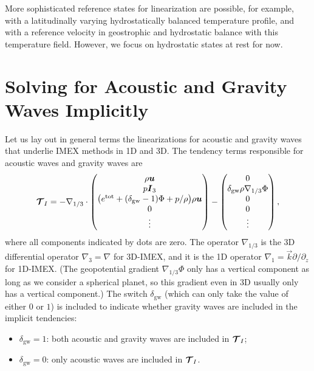 \documentclass{report}
\begin{document}
More sophisticated reference states for linearization are possible, for example, with a latitudinally varying hydrostatically balanced temperature profile, and with a reference velocity in geostrophic and hydrostatic balance with this temperature field. However, we focus on hydrostatic states at rest for now. 
 
 \section{Solving for Acoustic and Gravity Waves Implicitly}
 \label{s:IMEX_general}

Let us lay out in general terms the linearizations for acoustic and gravity waves that underlie IMEX methods in 1D and 3D. The tendency terms responsible for acoustic waves and gravity waves are
 \begin{equation}
 \boldsymbol{{\mathcal{T}}}_{I}= -\nabla_{1/3} \cdot
 \begin{pmatrix}
 \rho \boldsymbol{{u}} \\
 p \boldsymbol{{I}}_3 \\
 \bigl(e^{\mathrm{tot}} + (\delta_{\mathrm{gw}}-1) \Phi + p/\rho \bigr) \rho \boldsymbol{{u}} \\
 0\\
 \vdots
 \end{pmatrix}
 - \begin{pmatrix}
 0 \\
 \delta_{\mathrm{gw}} \rho \nabla_{1/3} \Phi \\
 0\\
 0\\
 \vdots
 \end{pmatrix},
 \label{e:3D-imex/tendencies}
 \end{equation}
where all components indicated by dots are zero. The operator $\nabla_{1/3}$ is the 3D differential operator $\nabla_3 = \nabla$ for 3D-IMEX, and it is the 1D operator $\nabla_1 = \vec{k} \partial/\partial_z$ for 1D-IMEX. (The geopotential gradient $\nabla_{1/3} \Phi$ only has a vertical component as long as we consider a spherical planet, so this gradient even in 3D usually only has a vertical component.) The switch $\delta_{\mathrm{gw}}$ (which can only take the value of either $0$ or $1$) is included to indicate whether gravity waves are included in the implicit tendencies: 
\begin{itemize}
    \item $\delta_{\mathrm{gw}}=1$: both acoustic and gravity waves are included in $\boldsymbol{{\mathcal{T}}}_I$;
    \item $\delta_{\mathrm{gw}}=0$: only acoustic waves are included in $\boldsymbol{{\mathcal{T}}}_I$.
\end{itemize}
\end{document}
